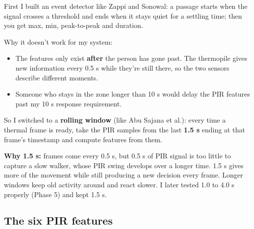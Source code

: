 \documentclass[11pt,a4paper]{article}
\providecommand{\tightlist}{\setlength{\itemsep}{0pt}\setlength{\parskip}{0pt}}
\begin{document}
First I built an event
detector like Zappi and
Sonowal: a passage starts when
the signal crosses a threshold
and ends when it stays quiet
for a settling time; then you
get max, min, peak-to-peak and
duration.

Why it doesn't work for my
system:

\begin{itemize}
\tightlist
\item
  The features only exist
  \textbf{after} the person
  has gone past. The
  thermopile gives new
  information every 0.5 s
  while they're still there,
  so the two sensors describe
  different moments.
\item
  Someone who stays in the
  zone longer than 10 s would
  delay the PIR features past
  my 10 s response
  requirement.
\end{itemize}

So I switched to a
\textbf{rolling window} (like
Abu Sajana et al.): every time
a thermal frame is ready, take
the PIR samples from the last
\textbf{1.5 s} ending at that
frame's timestamp and compute
features from them.

\textbf{Why 1.5 s:} frames
come every 0.5 s, but 0.5 s of
PIR signal is too little to
capture a slow walker, whose
PIR swing develops over a
longer time. 1.5 s gives more
of the movement while still
producing a new decision every
frame. Longer windows keep old
activity around and react
slower. I later tested 1.0 to
4.0 s properly (Phase 5) and
kept 1.5 s.

\hypertarget{the-six-pir-features}{%
\subsection{The six PIR
features}\label{the-six-pir-features}}
\end{document}

